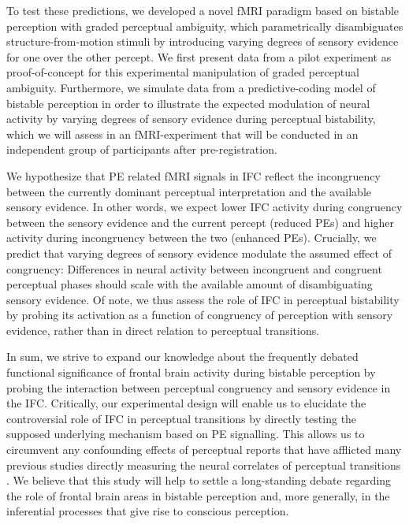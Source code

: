 \documentclass[12pt]{article}
\begin{document}
To test these predictions, we developed a novel fMRI paradigm based on bistable perception with graded perceptual ambiguity, which parametrically disambiguates structure-from-motion stimuli by introducing varying degrees of sensory evidence for one over the other percept. We first present data from a pilot experiment as proof-of-concept for this experimental manipulation of graded perceptual ambiguity. Furthermore, we simulate data from a predictive-coding model of bistable perception in order to illustrate the expected modulation of neural activity by varying degrees of sensory evidence during perceptual bistability, which we will assess in an fMRI-experiment that will be conducted in an independent group of participants after pre-registration.

We hypothesize that PE related fMRI signals in IFC reflect the incongruency between the currently dominant perceptual interpretation and the available sensory evidence. In other words, we expect lower IFC activity during congruency between the sensory evidence and the current percept (reduced PEs) and higher activity during incongruency between the two (enhanced PEs). Crucially, we predict that varying degrees of sensory evidence modulate the assumed effect of congruency: Differences in neural activity between incongruent and congruent perceptual phases should scale with the available amount of disambiguating sensory evidence. Of note, we thus assess the role of IFC in perceptual bistability by probing its activation as a function of congruency of perception with sensory evidence, rather than in direct relation to perceptual transitions.

In sum, we strive to expand our knowledge about the frequently debated functional significance of frontal brain activity during bistable perception by probing the interaction between perceptual congruency and sensory evidence in the IFC. Critically, our experimental design will enable us to elucidate the controversial role of IFC in perceptual transitions by directly testing the supposed underlying mechanism based on PE signalling. This allows us to circumvent any confounding effects of perceptual reports that have afflicted many previous studies directly measuring the neural correlates of perceptual transitions \parencite{Tsuchiya2016}. We believe that this study will help to settle a long-standing debate regarding the role of frontal brain areas in bistable perception and, more generally, in the inferential processes that give rise to conscious perception.
\end{document}
